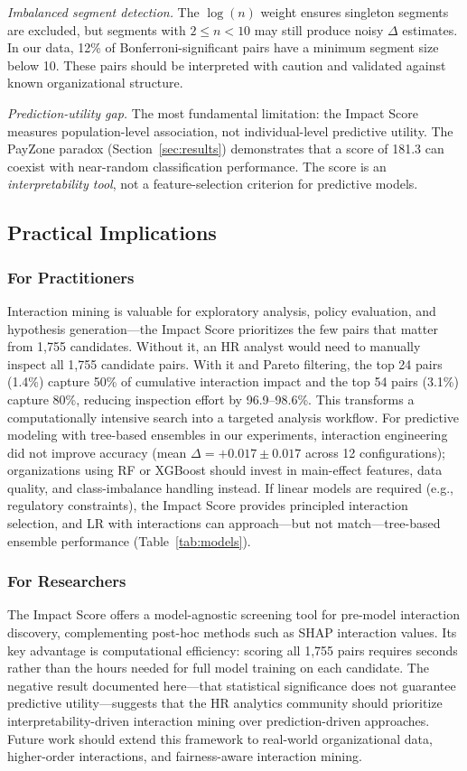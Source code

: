 \documentclass[conference]{IEEEtran}
\begin{document}
\textit{Imbalanced segment detection.} The $\log(n)$ weight ensures singleton segments are excluded, but segments with $2 \leq n < 10$ may still produce noisy $\Delta$ estimates. In our data, 12\% of Bonferroni-significant pairs have a minimum segment size below 10. These pairs should be interpreted with caution and validated against known organizational structure.

\textit{Prediction-utility gap.} The most fundamental limitation: the Impact Score measures population-level association, not individual-level predictive utility. The PayZone paradox (Section~\ref{sec:results}) demonstrates that a score of 181.3 can coexist with near-random classification performance. The score is an \textit{interpretability tool}, not a feature-selection criterion for predictive models.

\subsection{Practical Implications}

\subsubsection*{For Practitioners}
Interaction mining is valuable for exploratory analysis, policy evaluation, and hypothesis generation---the Impact Score prioritizes the few pairs that matter from 1,755 candidates. Without it, an HR analyst would need to manually inspect all 1,755 candidate pairs. With it and Pareto filtering, the top 24 pairs (1.4\%) capture 50\% of cumulative interaction impact and the top 54 pairs (3.1\%) capture 80\%, reducing inspection effort by 96.9--98.6\%. This transforms a computationally intensive search into a targeted analysis workflow. For predictive modeling with tree-based ensembles in our experiments, interaction engineering did not improve accuracy (mean $\Delta=+0.017\pm0.017$ across 12 configurations); organizations using RF or XGBoost should invest in main-effect features, data quality, and class-imbalance handling instead. If linear models are required (e.g., regulatory constraints), the Impact Score provides principled interaction selection, and LR with interactions can approach---but not match---tree-based ensemble performance (Table~\ref{tab:models}).

\subsubsection*{For Researchers}
The Impact Score offers a model-agnostic screening tool for pre-model interaction discovery, complementing post-hoc methods such as SHAP interaction values. Its key advantage is computational efficiency: scoring all 1,755 pairs requires seconds rather than the hours needed for full model training on each candidate. The negative result documented here---that statistical significance does not guarantee predictive utility---suggests that the HR analytics community should prioritize interpretability-driven interaction mining over prediction-driven approaches. Future work should extend this framework to real-world organizational data, higher-order interactions, and fairness-aware interaction mining.
\end{document}
